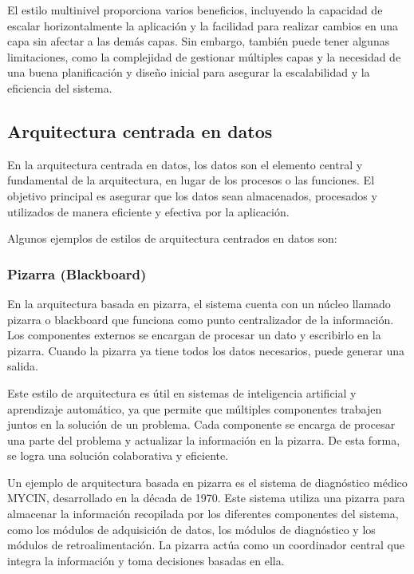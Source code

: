 \documentclass[executivepaper]{article}
\begin{document}
El estilo multinivel proporciona varios beneficios, incluyendo la capacidad de escalar horizontalmente la aplicación y la facilidad para realizar cambios en una capa sin afectar a las demás capas. Sin embargo, también puede tener algunas limitaciones, como la complejidad de gestionar múltiples capas y la necesidad de una buena planificación y diseño inicial para asegurar la escalabilidad y la eficiencia del sistema.

\newpage
\subsection{Arquitectura centrada en datos}

En la arquitectura centrada en datos, los datos son el elemento central y fundamental de la arquitectura, en lugar de los procesos o las funciones. El objetivo principal es asegurar que los datos sean almacenados, procesados y utilizados de manera eficiente y efectiva por la aplicación.

Algunos ejemplos de estilos de arquitectura centrados en datos son:

\subsubsection*{Pizarra (Blackboard)}

En la arquitectura basada en pizarra, el sistema cuenta con un núcleo llamado pizarra o blackboard que funciona como punto centralizador de la información. Los componentes externos se encargan de procesar un dato y escribirlo en la pizarra. Cuando la pizarra ya tiene todos los datos necesarios, puede generar una salida.

Este estilo de arquitectura es útil en sistemas de inteligencia artificial y aprendizaje automático, ya que permite que múltiples componentes trabajen juntos en la solución de un problema. Cada componente se encarga de procesar una parte del problema y actualizar la información en la pizarra. De esta forma, se logra una solución colaborativa y eficiente.

Un ejemplo de arquitectura basada en pizarra es el sistema de diagnóstico médico MYCIN, desarrollado en la década de 1970. Este sistema utiliza una pizarra para almacenar la información recopilada por los diferentes componentes del sistema, como los módulos de adquisición de datos, los módulos de diagnóstico y los módulos de retroalimentación. La pizarra actúa como un coordinador central que integra la información y toma decisiones basadas en ella.
\end{document}
